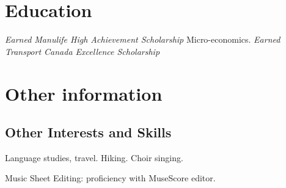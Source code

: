 \documentclass[letterpaper]{twentysecondcv} %
\begin{document}

\section{Education}

\begin{twenty} %
    {\emph{Earned Manulife High Achievement Scholarship}}
    {} %
    {Micro-economics. \emph{Earned Transport Canada Excellence Scholarship}} %

\end{twenty}


\section{Other information}

\subsection{Other Interests and Skills}

Language studies, travel.  Hiking. Choir singing.

Music Sheet Editing: proficiency with MuseScore editor.





\end{document}
